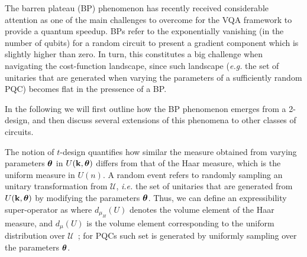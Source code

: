The barren plateau (BP) phenomenon has recently received considerable attention as one of the main challenges to overcome for the VQA framework to provide a quantum speedup. BPs refer to the exponentially vanishing (in the number of qubits) for a random circuit to present a gradient component which is slightly higher than zero. In turn, this constitutes a big challenge when navigating the cost-function landscape, since such landscape (\textit{e.g.} the set of unitaries that are generated when varying the parameters of a sufficiently random PQC) becomes flat in the pressence of a BP.

In the following we will first outline how the BP phenomenon emerges from a 2-design, and then discuss several extensions of this phenomena to other classes of circuits.

\vspace{1cm}

The notion of $t$-design quantifies how similar the measure obtained from varying parameters $\bm{\theta}$ in $U(\mathbf{k}, \bm{\theta})$ differs from that of the Haar measure, which is the uniform measure in $U(n)$. A random event refers to randomly sampling an unitary transformation from $\mathcal{U}$, \textit{i.e.} the set of unitaries that are generated from $U(\mathbf{k}, \bm{\theta})$ by modifying the parameters $\bm{\theta}$. Thus, we can define an expressibility super-operator as
where $d_{\mu_H}(U)$ denotes the volume element of the Haar measure, and $d_\mu(U)$ is the volume element corresponding to the uniform distribution over $\mathcal{U}$~\cite{holmes2021connecting}; for PQCs such set is generated by uniformly sampling over the parameters $\bm{\theta}$.

